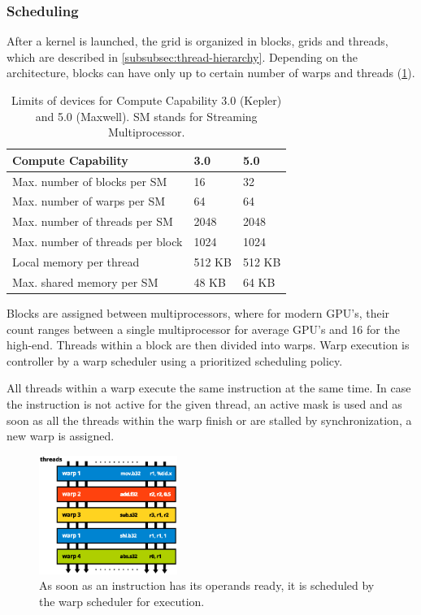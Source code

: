 \FloatBarrier

\subsubsection{Scheduling}\label{subsubsec:scheduling}

After a kernel is launched, the grid is organized in blocks, grids and threads, which are described in \ref{subsubsec:thread-hierarchy}. Depending on the architecture, blocks can have only up to certain number of warps and threads (\ref{tab:capability-3050}).

\begin{table}[htbp]
\begin{center}
\begin{tabularx}{0.75\textwidth}{| X | X | X |}
\hline
Compute Capability & 3.0 & 5.0 \\
\hline
Max. number of blocks per SM & 16 & 32 \\
\hline
Max. number of warps per SM & 64 & 64 \\
\hline
Max. number of threads per SM & 2048 & 2048\\
\hline
Max. number of threads per block & 1024 & 1024\\
\hline
Local memory per thread & 512 KB & 512 KB \\
\hline
Max. shared memory per SM & 48 KB & 64 KB\\
\hline
\end{tabularx}
\end{center}
\caption{Limits of devices for Compute Capability 3.0 (Kepler) and 5.0 (Maxwell). SM stands for Streaming Multiprocessor.}
\label{tab:capability-3050}
\end{table}

Blocks are assigned between multiprocessors, where for modern GPU's, their count ranges between a single multiprocessor for average GPU's and 16 for the high-end. Threads within a block are then divided into warps. Warp execution is controller by a warp scheduler using a prioritized scheduling policy.

All threads within a warp execute the same instruction at the same time. In case the instruction is not active for the given thread, an active mask is used and as soon as all the threads within the warp finish or are stalled by synchronization, a new warp is assigned.

\begin{figure}[h]
	\begin{center}
	\includegraphics[width=0.4\textwidth]{fig/scheduling.eps}
	\caption{As soon as an instruction has its operands ready, it is scheduled by the warp scheduler for execution.}
	\label{fig:scheduling}
	\end{center}
\end{figure}

